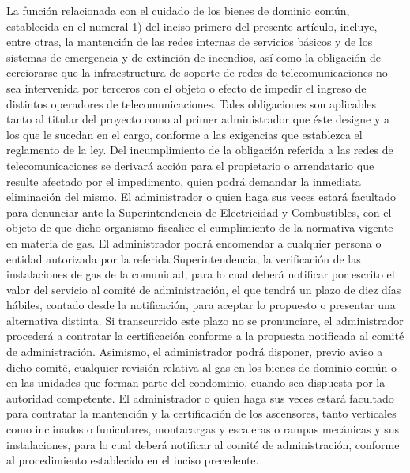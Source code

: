     La función relacionada con el cuidado de los bienes de dominio común, establecida en el numeral 1) del inciso primero del presente artículo, incluye, entre otras, la mantención de las redes internas de servicios básicos y de los sistemas de emergencia y de extinción de incendios, así como la obligación de cerciorarse que la infraestructura de soporte de redes de telecomunicaciones no sea intervenida por terceros con el objeto o efecto de impedir el ingreso de distintos operadores de telecomunicaciones. Tales obligaciones son aplicables tanto al titular del proyecto como al primer administrador que éste designe y a los que le sucedan en el cargo, conforme a las exigencias que establezca el reglamento de la ley. Del incumplimiento de la obligación referida a las redes de telecomunicaciones se derivará acción para el propietario o arrendatario que resulte afectado por el impedimento, quien podrá demandar la inmediata eliminación del mismo.
    El administrador o quien haga sus veces estará facultado para denunciar ante la Superintendencia de Electricidad y Combustibles, con el objeto de que dicho organismo fiscalice el cumplimiento de la normativa vigente en materia de gas. El administrador podrá encomendar a cualquier persona o entidad autorizada por la referida Superintendencia, la verificación de las instalaciones de gas de la comunidad, para lo cual deberá notificar por escrito el valor del servicio al comité de administración, el que tendrá un plazo de diez días hábiles, contado desde la notificación, para aceptar lo propuesto o presentar una alternativa distinta. Si transcurrido este plazo no se pronunciare, el administrador procederá a contratar la certificación conforme a la propuesta notificada al comité de administración. Asimismo, el administrador podrá disponer, previo aviso a dicho comité, cualquier revisión relativa al gas en los bienes de dominio común o en las unidades que forman parte del condominio, cuando sea dispuesta por la autoridad competente.
    El administrador o quien haga sus veces estará facultado para contratar la mantención y la certificación de los ascensores, tanto verticales como inclinados o funiculares, montacargas y escaleras o rampas mecánicas y sus instalaciones, para lo cual deberá notificar al comité de administración, conforme al procedimiento establecido en el inciso precedente.
     
